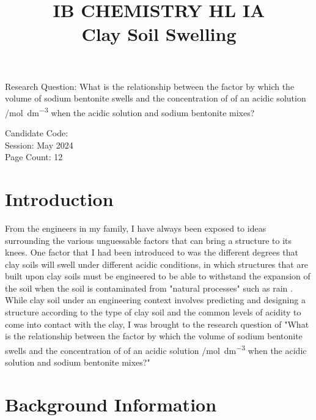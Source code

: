 \documentclass[11pt, letterpaper]{article}
\title{IB CHEMISTRY HL IA
\\
Clay Soil Swelling}
\author{}
\date{}
\begin{document}
\nocite{*}

\maketitle

\begin{center}
    Research Question: What is the relationship between
    the factor by which the volume of
    sodium bentonite swells and the concentration of  of an acidic solution /\unit{mol.dm^{-3}} when the acidic solution and sodium bentonite
    mixes?
    \\
\end{center}

\begin{center}
    Candidate Code:
    \\
    Session: May 2024
    \\
    Page Count: 12
\end{center}
\newpage

\tableofcontents
\newpage


\section{Introduction}

\setcounter{page}{1}

From the engineers in my family, I have always been exposed to ideas
surrounding the various unguessable factors that can
bring a structure to its knees. One factor that I had been
introduced to was the different degrees that clay soils will swell under different acidic conditions,
in which structures that are built upon clay soils must
be engineered to be able to withstand the expansion of the soil
when the soil is contaminated from "natural processes" such
as rain \cite{ramavaraprasadSwellingCharacteristicsSoils2018a}.
While clay soil under an engineering context involves
predicting and designing a structure according to the
type of clay soil and the common levels of acidity
to come into contact with the clay, I was brought to the
research question of "What is the relationship between
the factor by which the volume of
sodium bentonite swells and the concentration of  of an acidic solution /\unit{mol.dm^{-3}} when the acidic solution and sodium bentonite
mixes?"


\section{Background Information}
\end{document}
